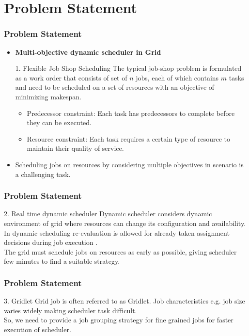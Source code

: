 \documentclass{beamer}
\begin{document}
\section[Problem Statement]{Problem Statement}
\begin{frame}[label=back3]
 \frametitle{Problem Statement}
\begin{itemize}
 	\item \textbf{Multi-objective dynamic scheduler in Grid}
	\begin{block}{1. Flexible Job Shop Scheduling} The typical job-shop problem is formulated as a work order that consists of set of $n$ jobs, each of which contains $m$ tasks and need to be scheduled on a set of resources with an objective of minimizing makespan.
	\end{block}
	\begin{itemize}
	\item Predecessor constraint: Each task has predecessors to complete before they can be executed.
	\item Resource constraint: Each task requires a certain type of resource to maintain their quality of service. 
	\end{itemize}
	\item Scheduling jobs on resources by considering multiple objectives in scenario is a challenging task. \hyperlink{multipleobj}{}
\end{itemize}
\end{frame}

\begin{frame}
 \frametitle{Problem Statement}
	\begin{block}{2. Real time dynamic scheduler} Dynamic scheduler considers dynamic environment of grid where resources can change its configuration and availability. In dynamic scheduling re-evaluation is allowed for already taken assignment decisions during job execution \cite{chtepen}.\\
	The grid must schedule jobs on resources as early as possible, giving scheduler few minutes to find a suitable strategy.\\
	\end{block}
\end{frame}
\begin{frame}
 \frametitle{Problem Statement}
	\begin{block}{3. Gridlet} Grid job is often referred to as Gridlet. Job characteristics e.g. job size varies widely making scheduler task difficult.\\
So, we need to provide a job grouping strategy for fine grained jobs for faster execution of scheduler. 
	\end{block}
\end{frame}
\end{document}
